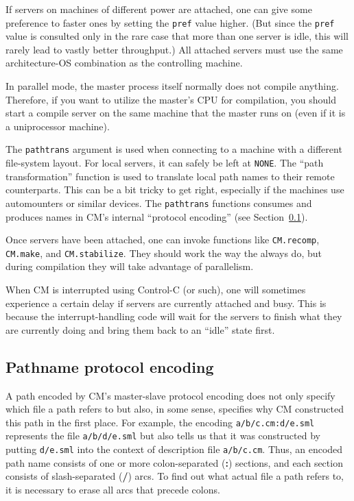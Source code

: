 \documentclass[titlepage,letterpaper]{article}
\begin{document}
If servers on machines of different power are attached, one can give
some preference to faster ones by setting the {\tt pref} value higher.
(But since the {\tt pref} value is consulted only in the rare case
that more than one server is idle, this will rarely lead to vastly
better throughput.) All attached servers must use the same
architecture-OS combination as the controlling machine.

In parallel mode, the master process itself normally does not compile
anything.  Therefore, if you want to utilize the master's CPU for
compilation, you should start a compile server on the same machine
that the master runs on (even if it is a uniprocessor machine).

The {\tt pathtrans} argument is used when connecting to a machine with
a different file-system layout.  For local servers, it can safely be
left at {\tt NONE}.  The ``path transformation'' function is used to
translate local path names to their remote counterparts.  This can be
a bit tricky to get right, especially if the machines use automounters
or similar devices.  The {\tt pathtrans} functions consumes and
produces names in CM's internal ``protocol encoding'' (see
Section~\ref{sec:pathencode}).

Once servers have been attached, one can invoke functions like
{\tt CM.recomp}, {\tt CM.make}, and {\tt CM.stabilize}.  They should
work the way the always do, but during compilation they will take
advantage of parallelism.

When CM is interrupted using Control-C (or such), one will sometimes
experience a certain delay if servers are currently attached and busy.
This is because the interrupt-handling code will wait for the servers
to finish what they are currently doing and bring them back to an
``idle'' state first.

\subsection{Pathname protocol encoding}
\label{sec:pathencode}

A path encoded by CM's master-slave protocol encoding does not only
specify which file a path refers to but also, in some sense, specifies
why CM constructed this path in the first place.  For example, the
encoding {\tt a/b/c.cm:d/e.sml} represents the file {\tt a/b/d/e.sml}
but also tells us that it was constructed by putting {\tt d/e.sml}
into the context of description file {\tt a/b/c.cm}.  Thus, an encoded
path name consists of one or more colon-separated ({\bf :}) sections,
and each section consists of slash-separated ({\bf /}) arcs.  To find
out what actual file a path refers to, it is necessary to erase all
arcs that precede colons.
\end{document}
